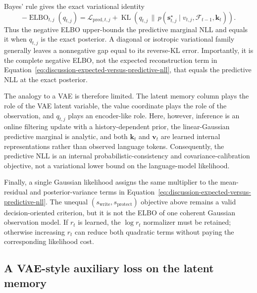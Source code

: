 \documentclass[11pt]{article}
\newcommand{\vct}[1]{\boldsymbol{#1}}
\begin{document}
Bayes' rule gives the exact variational identity
\begin{equation}
  -\operatorname{ELBO}_{t,j}(q_{t,j})
  =\mathcal{L}_{\mathrm{pred},t,j}
   +\operatorname{KL}\!\left(
      q_{t,j}\,\|\,
      p(\vct{s}_{t,j}^{\star}\mid
        v_{t,j},\mathcal{F}_{t-1},\vct{k}_t)
    \right).
  \label{eq:discussion-predictive-nll-variational-identity}
\end{equation}
Thus the negative ELBO upper-bounds the predictive marginal NLL and equals it when $q_{t,j}$ is
the exact posterior. A diagonal or isotropic variational family generally leaves a nonnegative
gap equal to its reverse-KL error. Importantly, it is the complete negative ELBO, not the expected
reconstruction term in Equation~\eqref{eq:discussion-expected-versus-predictive-nll}, that equals
the predictive NLL at the exact posterior.

The analogy to a VAE is therefore limited. The latent memory column plays the role of the VAE
latent variable, the value coordinate plays the role of the observation, and $q_{t,j}$ plays an
encoder-like role. Here, however, inference is an online filtering update with a history-dependent
prior, the linear-Gaussian predictive marginal is analytic, and both $\vct{k}_t$ and $\vct{v}_t$
are learned internal representations rather than observed language tokens. Consequently, the
predictive NLL is an internal probabilistic-consistency and covariance-calibration objective, not
a variational lower bound on the language-model likelihood.

Finally, a single Gaussian likelihood assigns the same multiplier to the mean-residual and
posterior-variance terms in Equation~\eqref{eq:discussion-expected-versus-predictive-nll}. The
unequal $(s_{\mathrm{write}},s_{\mathrm{protect}})$ objective above remains a valid
decision-oriented criterion, but it is not the ELBO of one coherent Gaussian observation model.
If $r_t$ is learned, the $\log r_t$ normalizer must be retained; otherwise increasing $r_t$ can
reduce both quadratic terms without paying the corresponding likelihood cost.

\subsection{A VAE-style auxiliary loss on the latent memory}
\end{document}
